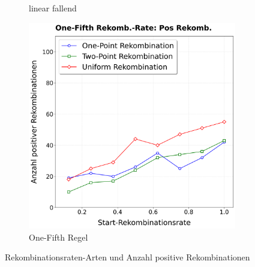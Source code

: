 \begin{figure}[H]
\begin{subfigure}[b]{0.32\textwidth}
		\caption{linear fallend}
		\label{fig:encodePosRekombinationClegg}
	\end{subfigure}%
	\hfill
	\begin{subfigure}[b]{0.32\textwidth}
		\includegraphics[width=\textwidth]{Bilder/EncodePlotPositiveRekombinationOneFifth.png}
		\caption{One-Fifth Regel}
		\label{fig:encodePosRekombinationOneFifth}
	\end{subfigure}
	\caption{Rekombinationsraten-Arten und Anzahl positive Rekombinationen}
	\label{fig:encodePosRekombination}
\end{figure}

